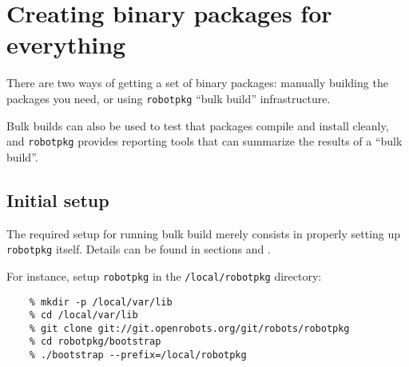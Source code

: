 %
%
%
%
%

\section{Creating binary packages for everything} %

There are  two ways of  getting a  set of binary  packages: manually building
the packages you need, or using {\tt robotpkg} ``bulk build'' infrastructure.

Bulk builds can also be used to test that packages compile and install cleanly,
and {\tt robotpkg} provides reporting tools that can summarize the results of a
``bulk build''.

\subsection{Initial setup} %
\label{section:bulk:setup}

The required setup for running bulk build merely consists in properly setting
up {\tt robotpkg} itself. Details can be found in sections
 and
.

For instance, setup {\tt robotpkg} in the {\tt /local/robotpkg} directory:
\begin{verbatim}
	% mkdir -p /local/var/lib
	% cd /local/var/lib
	% git clone git://git.openrobots.org/git/robots/robotpkg
	% cd robotpkg/bootstrap
	% ./bootstrap --prefix=/local/robotpkg
\end{verbatim}

